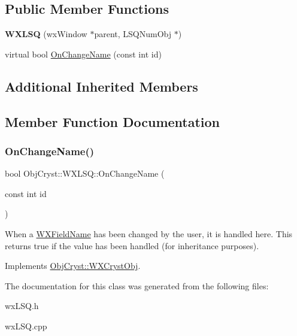 \subsection*{Public Member Functions}
\begin{DoxyCompactItemize}
\item 
\mbox{\label{class_obj_cryst_1_1_w_x_l_s_q_a9e2e14f047bb75f50bd5d533a302601b}} 
{\bfseries W\+X\+L\+SQ} (wx\+Window $\ast$parent, L\+S\+Q\+Num\+Obj $\ast$)
\item 
virtual bool \mbox{\hyperlink{class_obj_cryst_1_1_w_x_l_s_q_a077a2e40b76f733666b56699ee8f56fc}{On\+Change\+Name}} (const int id)
\end{DoxyCompactItemize}
\subsection*{Additional Inherited Members}


\subsection{Member Function Documentation}
\mbox{\label{class_obj_cryst_1_1_w_x_l_s_q_a077a2e40b76f733666b56699ee8f56fc}} 
\subsubsection{\texorpdfstring{OnChangeName()}{OnChangeName()}}
{\footnotesize\ttfamily bool Obj\+Cryst\+::\+W\+X\+L\+S\+Q\+::\+On\+Change\+Name (\begin{DoxyParamCaption}\item[{const int}]{id }\end{DoxyParamCaption})\hspace{0.3cm}{\ttfamily [virtual]}}

When a \mbox{\hyperlink{class_obj_cryst_1_1_w_x_field_name}{W\+X\+Field\+Name}} has been changed by the user, it is handled here. This returns true if the value has been handled (for inheritance purposes). 

Implements \mbox{\hyperlink{class_obj_cryst_1_1_w_x_cryst_obj_a3736357599263df7e550790753c040a3}{Obj\+Cryst\+::\+W\+X\+Cryst\+Obj}}.



The documentation for this class was generated from the following files\+:\begin{DoxyCompactItemize}
\item 
wx\+L\+S\+Q.\+h\item 
wx\+L\+S\+Q.\+cpp\end{DoxyCompactItemize}
